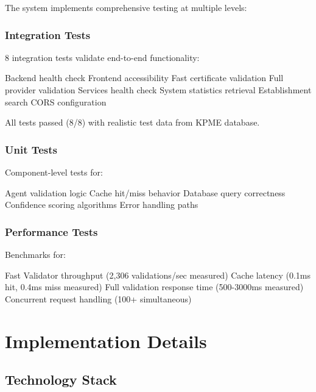 \documentclass[conference]{IEEEtran}
\begin{document}
The system implements comprehensive testing at multiple levels:

\subsubsection{Integration Tests}

8 integration tests validate end-to-end functionality:

Backend health check
Frontend accessibility
Fast certificate validation
Full provider validation
Services health check
System statistics retrieval
Establishment search
CORS configuration

All tests passed (8/8) with realistic test data from KPME database.

\subsubsection{Unit Tests}

Component-level tests for:

Agent validation logic
Cache hit/miss behavior
Database query correctness
Confidence scoring algorithms
Error handling paths

\subsubsection{Performance Tests}

Benchmarks for:

Fast Validator throughput (2,306 validations/sec measured)
Cache latency (0.1ms hit, 0.4ms miss measured)
Full validation response time (500-3000ms measured)
Concurrent request handling (100+ simultaneous)

\section{Implementation Details}

\subsection{Technology Stack}
\end{document}
